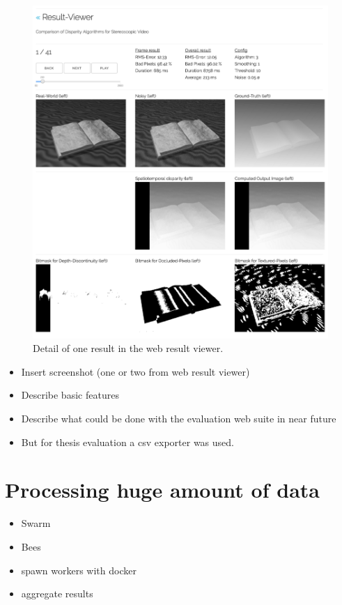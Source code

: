 \begin{figure}[p!]
  \centering
  \includegraphics[angle=90,width=1.0\textwidth]{src/images/result-viewer-detail.png}
  \caption{Detail of one result in the web result viewer.}
  \label{fig:web-detail}
\end{figure}

\begin{itemize}
  \item Insert screenshot (one or two from web result viewer)
  \item Describe basic features
  \item Describe what could be done with the evaluation web suite in near future
  \item But for thesis evaluation a csv exporter was used.
\end{itemize}

\section{Processing huge amount of data}

\begin{itemize}
  \item Swarm
  \item Bees
  \item spawn workers with docker
  \item aggregate results
\end{itemize}


